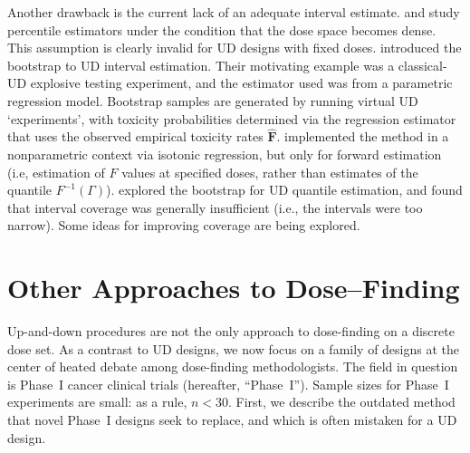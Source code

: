 Another drawback is the current lack of an adequate interval estimate.  \cite{Wright:1984} and \cite{Muke:1993} study percentile estimators under the condition that the dose space becomes dense.  This assumption is clearly invalid for UD designs with fixed doses.  \cite{Chao:Fuh:boot:2001} introduced the bootstrap to UD interval estimation. Their motivating example was a classical-UD explosive testing experiment, and the estimator used was from a parametric regression model. Bootstrap samples are generated by running virtual UD `experiments', with toxicity probabilities determined via the regression estimator that uses the observed empirical toxicity rates $\mathbf{\hat{F}}$.  \cite{Styl:Pros:Flou:esti:2003} implemented the method in a nonparametric context via isotonic regression, but only for forward estimation (i.e, estimation of $F$ values at specified doses, rather than estimates of the quantile $F^{-1}(\Gamma)$). \cite{Oron07} explored the bootstrap for UD quantile estimation, and found that interval coverage was generally insufficient (i.e., the intervals were too narrow). Some ideas for improving coverage are being explored.





\section{Other Approaches to Dose--Finding}\label{sec:other}

Up-and-down procedures are not the only approach to dose-finding on a discrete dose set. As a contrast to UD designs, we now focus on a family of designs at the center of heated debate among dose-finding methodologists. The field in question is Phase~I cancer clinical trials (hereafter, ``Phase~I''). Sample sizes for Phase~I experiments are small: as a rule, $n<30$. First, we describe the outdated method that novel Phase~I designs seek to replace, and which is often \citep{Rogat:etal:oped:2007,Zack:stag:2009} mistaken for a UD design.

